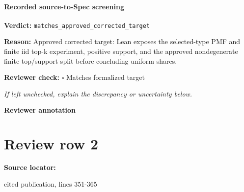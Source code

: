 \documentclass[10pt]{article}
\newcommand{\reviewerbox}{%
  \par\noindent\fbox{\parbox{0.96\linewidth}{\rule{0pt}{0.38in}}}\par
}
\newcommand{\reviewmatch}[1]{%
  \par\noindent\textbf{Reviewer check:} $\square$\; #1\par
  \noindent\emph{If left unchecked, explain the discrepancy or uncertainty below.}\par
}
\begin{document}
\paragraph{Recorded source-to-Spec screening}
\textbf{Verdict:} \texttt{matches\_approved\_corrected\_target}
\\
{\raggedright
\textbf{Reason:} Approved corrected target:\allowbreak{} Lean exposes the selected-\allowbreak{}type PMF and finite iid top-\allowbreak{}k experiment, positive support, and the approved nondegenerate finite top/\allowbreak{}support split before concluding uniform shares.\allowbreak{}
\par}
\reviewmatch{Matches formalized target}
\noindent\textbf{Reviewer annotation}\par
\reviewerbox
\clearpage
\hypertarget{source-claim-8765a3b8d5c11957}{}
\section*{Review row 2}
\textbf{Source locator:} {\footnotesize\raggedright cited publication, lines 351-\allowbreak{}365\par}
\end{document}
